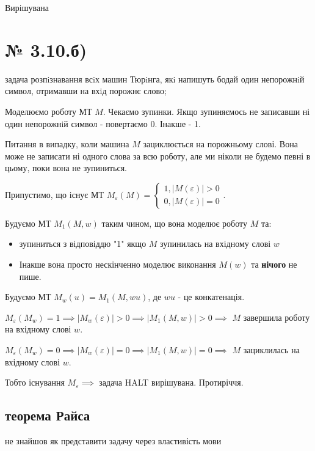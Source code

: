 \documentclass[11pt, a4paper]{article} %
\begin{document}
\begin{mdframed}[style=ans]
    Вирішувана
\end{mdframed}


\section*{№ 3.10.б)}
\begin{mdframed}
    задача розпiзнавання всiх машин Тюрiнга, якi напишуть бодай один
    непорожнiй символ, отримавши на вхiд порожнє слово;
\end{mdframed}

Моделюємо роботу МТ $M$.
Чекаємо зупинки.
Якщо зупиняємось не записавши ні один непорожнiй символ - повертаємо 0. Інакше - 1.

Питання в випадку, коли машина $M$ зациклюється на порожньому слові. 
Вона може не записати ні одного слова за всю роботу, але ми ніколи не будемо певні в цьому, поки вона не зупиниться.

Припустимо, що існує МТ $M_{\varepsilon}(M) = \begin{cases}
    1, |M(\varepsilon)| > 0\\
    0, |M(\varepsilon)| = 0
\end{cases}$.

Будуємо МТ $M_1(M,w)$ таким чином, що вона моделює роботу $M$ та:
\begin{itemize}
    \item зупиниться з відповіддю "1" якщо $M$ зупинилась на вхідному слові $w$
    \item Інакше вона просто нескінченно моделює виконання $M(w)$ та \textbf{нічого} не пише.
\end{itemize}

Будуємо МТ $M_w(u) = M_1(M,wu)$, де $wu$ - це конкатенація. 

$M_\varepsilon(M_w) = 1 \implies |M_w(\varepsilon)| > 0 \implies |M_1(M,w)| > 0 \implies $ $M$ завершила роботу на вхідному слові $w$.

$M_\varepsilon(M_w) = 0 \implies |M_w(\varepsilon)| = 0 \implies |M_1(M,w)| = 0 \implies $ $M$ зациклилась на вхідному слові $w$.

Тобто існування $M_\varepsilon \implies $ задача HALT вирішувана. Протиріччя.

\subsection*{теорема Райса}
не знайшов як представити задачу через властивість мови
\end{document}
